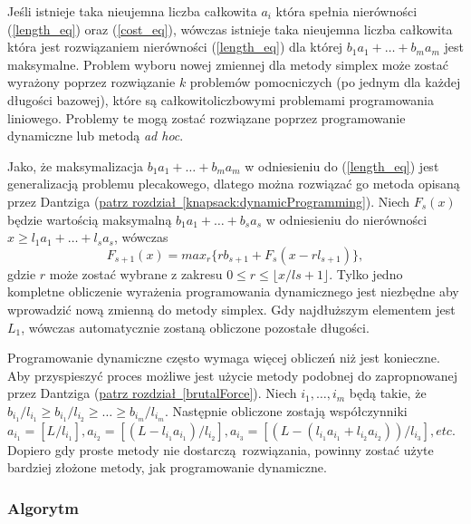 Jeśli istnieje taka nieujemna liczba całkowita $a_i$ która spełnia nierówności (\ref{length_eq}) oraz (\ref{cost_eq}), wówczas istnieje taka nieujemna liczba całkowita która jest rozwiązaniem nierówności (\ref{length_eq}) dla której $b_1a_1+\dots+b_ma_m$ jest maksymalne. Problem wyboru nowej zmiennej dla metody simplex może zostać wyrażony poprzez rozwiązanie $k$ problemów pomocniczych (po jednym dla każdej długości bazowej), które są całkowitoliczbowymi problemami programowania liniowego. Problemy te mogą zostać rozwiązane poprzez programowanie dynamiczne lub metodą \textit{ad hoc}.

Jako, że maksymalizacja $b_1a_1+\dots+b_ma_m$ w odniesieniu do (\ref{length_eq}) jest generalizacją problemu plecakowego, dlatego można rozwiązać go metoda opisaną przez Dantziga \cite{DantzigArticle} (\hyperref[knapsack:dynamicProgramming]{patrz rozdział~\ref*{knapsack:dynamicProgramming}}). Niech $F_s(x)$ będzie wartością maksymalną $b_1a_1+\dots+b_sa_s$ w odniesieniu do nierówności $x \ge l_1a_1+\dots+l_sa_s$, wówczas
\begin{equation*}
  F_{s+1}(x) = max_r\{rb_{s+1}+F_s(x-rl_{s+1})\},
\end{equation*}
gdzie $r$ może zostać wybrane z zakresu $0 \le r \le \lfloor x/l{s+1} \rfloor$. Tylko jedno kompletne obliczenie wyrażenia programowania dynamicznego jest niezbędne aby wprowadzić nową zmienną do metody simplex. Gdy najdłuższym elementem jest $L_1$, wówczas automatycznie zostaną obliczone pozostałe długości.

Programowanie dynamiczne często wymaga więcej obliczeń niż jest konieczne. Aby przyspieszyć proces możliwe jest użycie metody podobnej do zapropnowanej przez Dantziga \cite{DantzigArticle} (\hyperref[brutalForce]{patrz rozdział~\ref*{brutalForce}}). Niech $i_1,\dots,i_m$ będą takie, że $b_i_1/l_i_1 \ge b_i_1/l_i_2 \ge \dots \ge b_i_m/l_i_m$. Następnie obliczone zostają współczynniki $a_i_1=[L/l_i_1], a_i_2=[(L-l_i_1a_i_1)/l_i_2], a_i_3 = [(L - (l_i_1a_i_1 + l_i_2a_i_2))/l_i_3], etc$. Dopiero gdy proste metody nie dostarczą rozwiązania, powinny zostać użyte bardziej złożone metody, jak programowanie dynamiczne.

\subsubsection{Algorytm}

